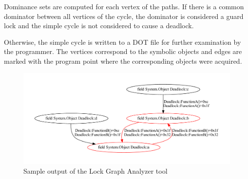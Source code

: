 Dominance sets are computed for each vertex of the paths. If there is a common dominator between all vertices of the cycle, the dominator is considered a guard lock and the simple cycle is not considered to cause a deadlock.

Otherwise, the simple cycle is written to a DOT file for further examination by the programmer. The vertices correspond to the symbolic objects and edges are marked with the program point where the corresponding objects were acquired.

\begin{figure}
\begin{center}
\includegraphics[scale=0.5]{LockGraphAnalyzerOutput.pdf}
\end{center}
\caption{Sample output of the Lock Graph Analyzer tool}
\end{figure}